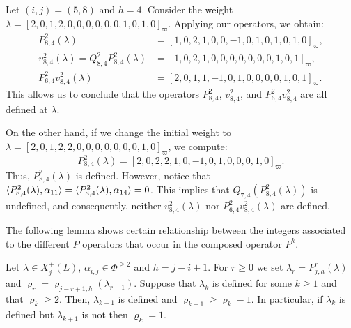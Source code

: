 \begin{example}\rm
Let $(i,j)=(5,8)$ and $h = 4$. Consider the weight $\lambda = [2,0,1,2,0,0,0,0,0,0,1,0,1,0]_{\varpi}$. 
Applying our operators, we obtain:
\begin{equation}
\begin{aligned}
    P_{8,4}^2(\lambda) &= [1, 0, 2, 1, 0, 0, -1, 0, 1, 0, 1, 0, 1, 0]_{\varpi}, \\[5pt]
    v_{8,4}^2(\lambda) = Q_{8,4}^2P_{8,4}^2(\lambda) &= [1, 0, 2, 1, 0, 0, 0, 0, 0, 0, 0, 1, 0, 1]_{\varpi}, \\[5pt]
    P_{6,4}^2v_{8,4}^2(\lambda) &= [2, 0, 1, 1, -1, 0, 1, 0, 0, 0, 0, 1, 0, 1]_{\varpi}.
\end{aligned}
\end{equation}
This allows us to conclude that the operators $P_{8,4}^2$, $v_{8,4}^2$, and $P_{6,4}^2v_{8,4}^2$ are all defined at $\lambda$.

\medskip
On the other hand, if we change the initial weight to $\lambda = [2,0,1,2,2,0,0,0,0,0,0,0,1,0]_{\varpi}$, we compute:
\begin{equation}
    P_{8,4}^2(\lambda) = [2, 0, 2, 2, 1, 0, -1, 0, 1, 0, 0, 0, 1, 0]_{\varpi}.
\end{equation}
Thus, $P_{8,4}^2(\lambda)$ is defined. However, notice that $\langle P_{8,4}^2(\lambda) , \alpha_{11} \rangle = \langle P_{8,4}^2(\lambda) , \alpha_{14} \rangle = 0$. This implies that $Q_{7,4}(P_{8,4}^2(\lambda))$ is undefined, and consequently, neither $v_{8,4}^2(\lambda)$ nor $P_{6,4}^2v_{8,4}^2(\lambda)$ are defined.
\end{example}




The following lemma shows certain relationship between the integers associated to the different $P$ operators that occur in the composed operator $P^k$. 


\begin{lemma} \label{lem: desigualdad de varrhos}
    Let $\lambda \in X^+_{j}(L)$, $\alpha_{i,j}\in \Phi^{\geq 2}$ and $h=j-i+1$. 
    For $r\geq 0$ we set $\lambda_{r} = P^r_{j,h}   (\lambda) $ and  $\varrho_{r}=\varrho_{j-r+1,h}(\lambda_{r-1})   $.
    Suppose that  $\lambda_{k}$ is defined for some  $k\geq 1$ and that  $\varrho_{k}\geq 2$. 
    Then, $\lambda_{k+1}$ is defined and $\varrho_{k+1} \geq \varrho_{k} - 1$.
    In particular, if $\lambda_{k}$ is defined but $\lambda_{k+1}$ is not then $\varrho_k=1$.   
\end{lemma}

